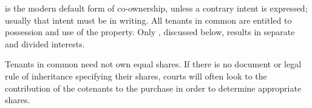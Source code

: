  is the modern default form of
co-ownership, unless a contrary
intent is expressed; usually that intent must be in writing.  All tenants in
common are entitled to possession and use of the property.  Only
, discussed below, results in separate and divided interests.

Tenants in common need not own equal shares.  If there is no document or legal
rule of inheritance specifying their shares, courts will often look to the
contribution of the cotenants to the purchase in order to determine appropriate
shares.

